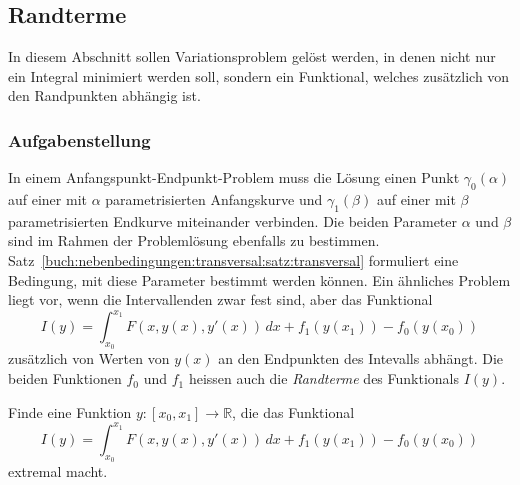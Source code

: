 %
%
\subsection{Randterme
\label{buch:nebenbedingungen:transversal:subsection:randterme}}
In diesem Abschnitt sollen Variationsproblem gelöst werden, in denen
nicht nur ein Integral minimiert werden soll, sondern ein Funktional,
welches zusätzlich von den Randpunkten abhängig ist.

%
%
\subsubsection{Aufgabenstellung}
In einem Anfangspunkt-Endpunkt-Problem muss die Lösung einen Punkt
$\gamma_0(\alpha)$ auf einer mit $\alpha$ parametrisierten Anfangskurve
und $\gamma_1(\beta)$ auf einer mit $\beta$ parametrisierten Endkurve
miteinander verbinden.
Die beiden Parameter $\alpha$ und $\beta$ sind im Rahmen der Problemlösung
ebenfalls zu bestimmen.
Satz~\ref{buch:nebenbedingungen:transversal:satz:transversal}
formuliert eine Bedingung, mit diese Parameter bestimmt werden können.
Ein ähnliches Problem liegt vor, wenn die Intervallenden zwar fest sind,
aber das Funktional
\[
I(y)
=
\int_{x_0}^{x_1}
F(x,y(x),y'(x))
\,dx
+
f_1(y(x_1))
-
f_0(y(x_0))
\]
zusätzlich von Werten von $y(x)$ an den Endpunkten des Intevalls
abhängt.
Die beiden Funktionen $f_0$ und $f_1$ heissen auch die {\em Randterme}
des Funktionals $I(y)$.

\begin{aufgabe}
\label{buch:nebenbedingungen:transversal:aufgabe:randterme}
Finde eine Funktion $y\colon[x_0,x_1]\to\mathbb{R}$, die das Funktional
\begin{equation}
I(y)
=
\int_{x_0}^{x_1}
F(x,y(x),y'(x))\,dx
+
f_1(y(x_1))
-
f_0(y(x_0))
\label{buch:nebenbedingungen:transversal:eqn:randterme}
\end{equation}
extremal macht.
\end{aufgabe}

%
%
